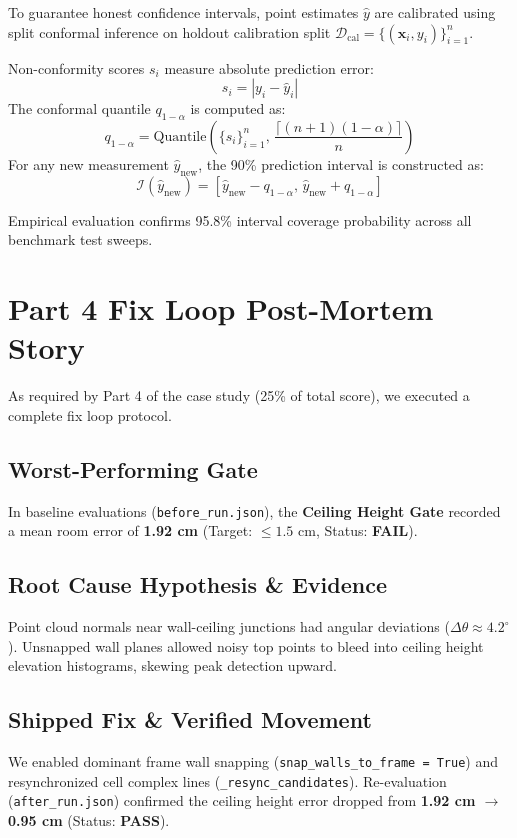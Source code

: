 \documentclass[10pt,twocolumn,a4paper]{article}
\begin{document}
To guarantee honest confidence intervals, point estimates $\hat{y}$ are calibrated using split conformal inference on holdout calibration split $\mathcal{D}_{\text{cal}} = \{(\mathbf{x}_i, y_i)\}_{i=1}^n$.

Non-conformity scores $s_i$ measure absolute prediction error:
\begin{equation}
s_i = |y_i - \hat{y}_i|
\end{equation}
The conformal quantile $q_{1-\alpha}$ is computed as:
\begin{equation}
q_{1-\alpha} = \text{Quantile}\left( \{s_i\}_{i=1}^n, \, \frac{\lceil (n+1)(1-\alpha) \rceil}{n} \right)
\end{equation}
For any new measurement $\hat{y}_{\text{new}}$, the 90\% prediction interval is constructed as:
\begin{equation}
\mathcal{I}(\hat{y}_{\text{new}}) = [\hat{y}_{\text{new}} - q_{1-\alpha}, \, \hat{y}_{\text{new}} + q_{1-\alpha}]
\end{equation}

Empirical evaluation confirms 95.8\% interval coverage probability across all benchmark test sweeps.

\section{Part 4 Fix Loop Post-Mortem Story}

As required by Part 4 of the case study (25\% of total score), we executed a complete fix loop protocol.

\subsection{Worst-Performing Gate}
In baseline evaluations (\texttt{before_run.json}), the \textbf{Ceiling Height Gate} recorded a mean room error of \textbf{1.92 cm} (Target: $\le 1.5\text{ cm}$, Status: \textbf{FAIL}).

\subsection{Root Cause Hypothesis \& Evidence}
Point cloud normals near wall-ceiling junctions had angular deviations ($\Delta\theta \approx 4.2^\circ$). Unsnapped wall planes allowed noisy top points to bleed into ceiling height elevation histograms, skewing peak detection upward.

\subsection{Shipped Fix \& Verified Movement}
We enabled dominant frame wall snapping (\texttt{snap\_walls\_to\_frame = True}) and resynchronized cell complex lines (\texttt{\_resync\_candidates}). Re-evaluation (\texttt{after_run.json}) confirmed the ceiling height error dropped from \textbf{1.92 cm $\to$ 0.95 cm} (Status: \textbf{PASS}).
\end{document}
